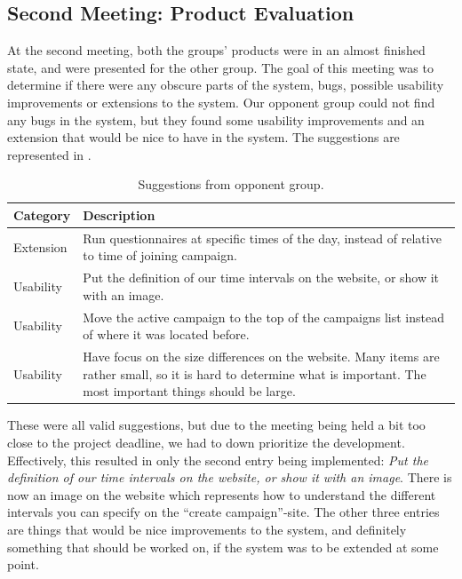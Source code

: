 \subsection{Second Meeting: Product Evaluation}
\label{sub:second_meeting_product_evaluation}

At the second meeting, both the groups' products were in an almost finished state, and were presented for the other group. The goal of this meeting was to determine if there were any obscure parts of the system, bugs, possible usability improvements or extensions to the system. Our opponent group could not find any bugs in the system, but they found some usability improvements and an extension that would be nice to have in the system. The suggestions are represented in . 

\begin{table}[!htbp]
    \centering
    \begin{tabular}{|l|p{}|}
    \hline
    \textbf{Category} & \textbf{Description} \\ \hline
    Extension & Run questionnaires at specific times of the day, instead of relative to time of joining campaign.  \\ \hline
    Usability & Put the definition of our time intervals on the website, or show it with an image. \\ \hline
    Usability & Move the active campaign to the top of the campaigns list instead of where it was located before. \\ \hline
    Usability & Have focus on the size differences on the website. Many items are rather small, so it is hard to determine what is important. The most important things should be large. \\ \hline
    \end{tabular}
    \caption{Suggestions from opponent group.}
    \label{tab:suggestions_from_opponent_group}
\end{table}

These were all valid suggestions, but due to the meeting being held a bit too close to the project deadline, we had to down prioritize the development. Effectively, this resulted in only the second entry being implemented: \emph{Put the definition of our time intervals on the website, or show it with an image}. There is now an image on the website which represents how to understand the different intervals you can specify on the ``create campaign''-site. The other three entries are things that would be nice improvements to the system, and definitely something that should be worked on, if the system was to be extended at some point. 



